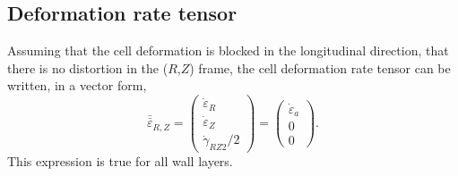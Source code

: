 \documentclass[]{article}
\begin{document}
\subsection{Deformation rate tensor}
Assuming that the cell deformation is blocked in the longitudinal direction, that there is no distortion in the ($R$,$Z$) frame, the cell deformation rate tensor can be written, in a vector form,
\begin{equation}
	\boxed{
	\bar{\bar{\varepsilon}}_{R,Z}= \left(\begin{matrix}
		\dot{\varepsilon}_R\\
		\dot{\varepsilon}_Z\\
		\dot{\gamma}_{RZ2}/2
	\end{matrix}\right)
=
\left(\begin{matrix}
	\dot{\varepsilon}_a\\
	0\\
	0
\end{matrix}\right)}.
\end{equation}
This expression is true for all wall layers.
\end{document}
